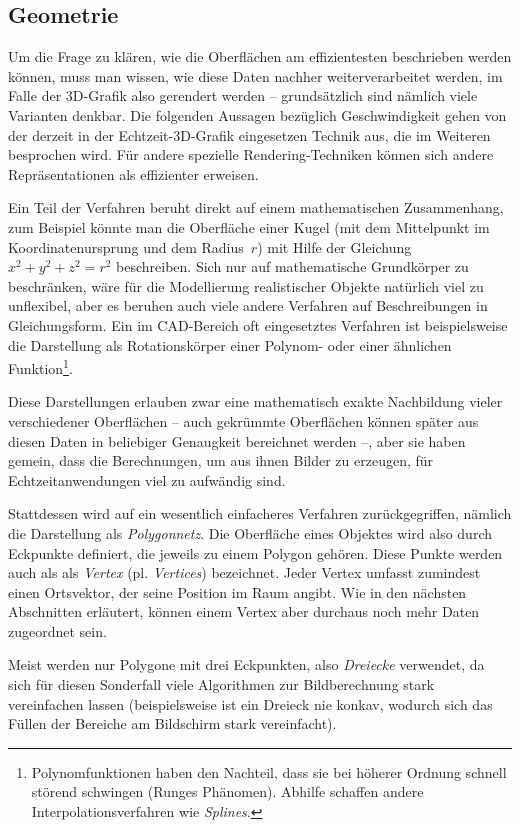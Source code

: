 \subsection{Geometrie}
\label{vertex}
Um die Frage zu klären, wie die Oberflächen am effizientesten beschrieben werden können, muss man wissen, wie diese Daten nachher weiterverarbeitet werden, im Falle der 3D-Grafik also gerendert werden -- grundsätzlich sind nämlich viele Varianten denkbar. Die folgenden Aussagen bezüglich Geschwindigkeit gehen von der derzeit in der Echtzeit-3D-Grafik eingesetzen Technik aus, die im Weiteren besprochen wird. Für andere spezielle Rendering-Techniken können sich andere Repräsentationen als effizienter erweisen.

Ein Teil der Verfahren beruht direkt auf einem mathematischen Zusammenhang, zum Beispiel könnte man die Oberfläche einer Kugel (mit dem Mittelpunkt im Koordinatenursprung und dem Radius~$r$) mit Hilfe der Gleichung $x^2 + y^2 + z^2 = r^2$ beschreiben. Sich nur auf mathematische Grundkörper zu beschränken, wäre für die Modellierung realistischer Objekte natürlich viel zu unflexibel, aber es beruhen auch viele andere Verfahren auf Beschreibungen in Gleichungsform. Ein im CAD-Bereich oft eingesetztes Verfahren ist beispielsweise die Darstellung als Rotationskörper einer Polynom- oder einer ähnlichen Funktion\footnote{Polynomfunktionen haben den Nachteil, dass sie bei höherer Ordnung schnell störend schwingen (Runges Phänomen). Abhilfe schaffen andere Interpolationsverfahren wie \emph{Splines}.}.

Diese Darstellungen erlauben zwar eine mathematisch exakte Nachbildung vieler verschiedener Oberflächen -- auch gekrümmte Oberflächen können später aus diesen Daten in beliebiger Genaugkeit bereichnet werden --, aber sie haben gemein, dass die Berechnungen, um aus ihnen Bilder zu erzeugen, für Echtzeitanwendungen viel zu aufwändig sind.

Stattdessen wird auf ein wesentlich einfacheres Verfahren zurückgegriffen, nämlich die Darstellung als \emph{Polygonnetz}. Die Oberfläche eines Objektes wird also durch Eckpunkte definiert, die jeweils zu einem Polygon gehören. Diese Punkte werden auch als als \emph{Vertex} (pl. \emph{Vertices}) bezeichnet. Jeder Vertex umfasst zumindest einen Ortsvektor, der seine Position im Raum angibt. Wie in den nächsten Abschnitten erläutert, können einem Vertex aber durchaus noch mehr Daten zugeordnet sein.

Meist werden nur Polygone mit drei Eckpunkten, also \emph{Dreiecke} verwendet, da sich für diesen Sonderfall viele Algorithmen zur Bildberechnung stark vereinfachen lassen (beispielsweise ist ein Dreieck nie konkav, wodurch sich das Füllen der Bereiche am Bildschirm stark vereinfacht).

